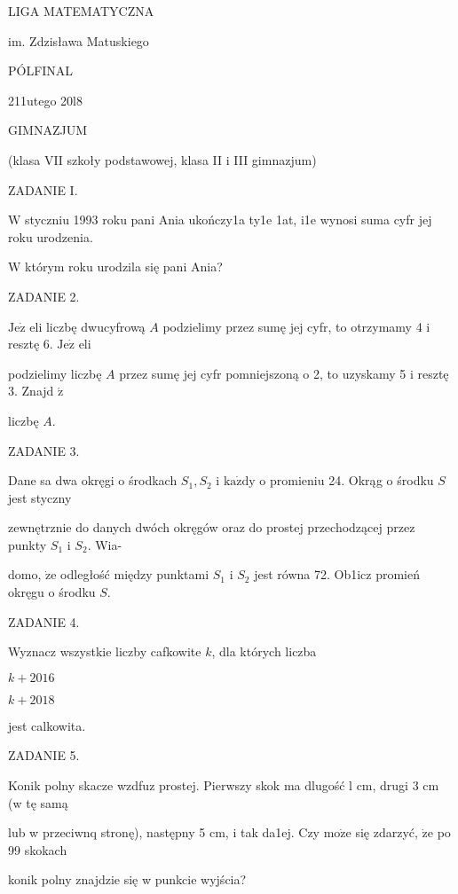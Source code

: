 \documentclass[a4paper,12pt]{article}
\begin{document}
LIGA MATEMATYCZNA

im. Zdzisława Matuskiego

PÓLFINAL

211utego 20l8

GIMNAZJUM

(klasa VII szkoły podstawowej, klasa II i III gimnazjum)

ZADANIE I.

$\mathrm{W}$ styczniu 1993 roku pani Ania ukończy1a ty1e 1at, i1e wynosi suma cyfr jej roku urodzenia.

$\mathrm{W}$ którym roku urodzila się pani Ania?

ZADANIE 2.

$\mathrm{J}\mathrm{e}\dot{\mathrm{z}}$ eli liczbę dwucyfrową $A$ podzielimy przez sumę jej cyfr, to otrzymamy 4 i resztę 6. $\mathrm{J}\mathrm{e}\dot{\mathrm{z}}$ eli

podzielimy liczbę $A$ przez sumę jej cyfr pomniejszoną o 2, to uzyskamy 5 i resztę 3. Znajd $\acute{\mathrm{z}}$

liczbę $A.$

ZADANIE 3.

Dane sa dwa okręgi o środkach $S_{1}, S_{2}$ i $\mathrm{k}\mathrm{a}\dot{\mathrm{z}}\mathrm{d}\mathrm{y}$ o promieniu 24. Okrąg o środku $S$ jest styczny

zewnętrznie do danych dwóch okręgów oraz do prostej przechodzącej przez punkty $S_{1}$ i $S_{2}$. Wia-

domo, $\dot{\mathrm{z}}\mathrm{e}$ odległość między punktami $S_{1}$ i $S_{2}$ jest równa 72. Ob1icz promień okręgu o środku $S.$

ZADANIE 4.

Wyznacz wszystkie liczby cafkowite $k$, dla których liczba

$k+2016$

$k+2018$

jest calkowita.

ZADANIE 5.

Konik polny skacze wzdfuz prostej. Pierwszy skok ma dlugość l cm, drugi 3 cm (w tę samą

lub w przeciwnq stronę), następny 5 cm, i tak da1ej. Czy $\mathrm{m}\mathrm{o}\dot{\mathrm{z}}\mathrm{e}$ się zdarzyć, $\dot{\mathrm{z}}\mathrm{e}$ po 99 skokach

konik polny znajdzie się w punkcie wyjścia?
\end{document}
